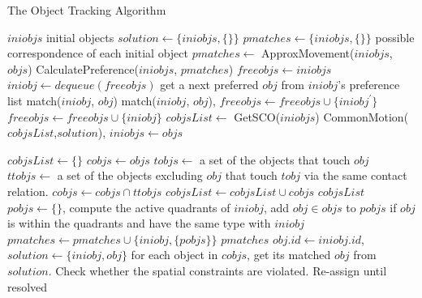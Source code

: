 \documentclass[letterpaper]{article}
\begin{document}
\begin{algorithm}[!]
\caption{The Object Tracking Algorithm}\label{algo}
\begin{algorithmic}[1]
\State $iniobjs$ \Comment initial objects
\State $solution \leftarrow \{iniobjs, \{\}\}$
\State $pmatches \leftarrow \{iniobjs, \{\}\}$ \Comment possible correspondence of each initial object
\State $pmatches \leftarrow$ ApproxMovement($iniobjs$, $objs$) \label{SetPossible}
\State CalculatePreference($iniobjs$, $pmatches$)\label{calPref}
\State $freeobjs \leftarrow iniobjs$
\label{stableMarriage}
\State $iniobj \leftarrow dequeue(freeobjs)$
\State get a next preferred $obj$ from $iniobj$'s preference list  
  \State match($iniobj$, $obj$)
  \State match($iniobj$, $obj$), $freeobjs \leftarrow freeobjs \cup \{iniobj^{\prime}\}$
  \Else 
  \State $freeobjs \leftarrow freeobjs \cup \{iniobj\}$
\EndIf 
\EndIf
\EndWhile
\State $cobjsList \leftarrow$ GetSCO($iniobjs$)
\State CommonMotion($cobjsList$,$solution$), $iniobjs \leftarrow objs$
\EndProcedure

\label{getSCO}
\State $cobjsList \leftarrow \{\}$
\State $cobjs \leftarrow objs$ 
\State $tobjs \leftarrow$ a set of the objects that touch $obj$
\State $ttobjs \leftarrow$ a set of the objects excluding $obj$ that touch $tobj$ via the same contact relation.
\State $cobjs \leftarrow cobjs \cap ttobjs$
\EndFor
\State $cobjsList \leftarrow cobjsList \cup cobjs$
\EndFor
\Return $cobjsList$
\EndProcedure
{}\label{MA}
\State $pobjs \leftarrow \{\}$, compute the active quadrants of $iniobj$, add $obj \in objs$ to $pobjs$ if $obj$ is within the quadrants and have the same type with $iniobj$ 
\State $pmatches \leftarrow pmatches \cup \{iniobj, \{pobjs\}\}$
\EndFor
\Return $pmatches$
\EndProcedure
{}
\State $obj.id \leftarrow iniobj.id$, $solution \leftarrow \{iniobj, obj\}$
\EndProcedure
{}\label{CommonMotion}
\State for each object in $cobjs$, get its matched $obj$ from $solution$. Check whether the spatial constraints are violated. Re-assign until resolved  
\EndFor
\EndProcedure
\end{algorithmic}
\end{algorithm}
\newpage



 
\end{document}
